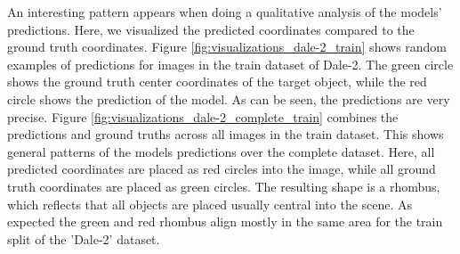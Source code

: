 An interesting pattern appears when doing a qualitative analysis of the models' predictions.
Here, we visualized the predicted coordinates compared to the ground truth coordinates.
Figure \ref{fig:visualizations_dale-2_train} shows random examples of predictions for images in the train dataset of Dale-2.
The green circle shows the ground truth center coordinates of the target object, while the red circle shows the prediction of the model.
As can be seen, the predictions are very precise.
Figure \ref{fig:visualizations_dale-2_complete_train} combines the predictions and ground truths across all images in the train dataset.
This shows general patterns of the models predictions over the complete dataset.
Here, all predicted coordinates are placed as red circles into the image, while all ground truth coordinates are placed as green circles.
The resulting shape is a rhombus, which reflects that all objects are placed usually central into the scene.
As expected the green and red rhombus align mostly in the same area for the train split of the 'Dale-2' dataset.


